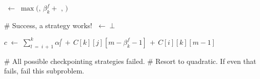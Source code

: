 \begin{algorithm}
{{{{                    \Peak \(\;\leftarrow\; \max( \)\PeakFs\(,\, \beta^f_k + \) \PeakR\(,\,\)\PeakL\( ) \)\;
                    \BlankLine
            
                    \BlankLine
            
                    \# Success, a strategy works!\;
                    \Failed\(\;\leftarrow\; \bot\)\;
                    \BlankLine
            
                    \(c \;\leftarrow\; \sum_{l\;=\;i\,+\,1}^k \alpha^f_l \,+\, C[k][j][m-\beta^f_k-1] \,+\, C[i][k][m-1]\)\;
                    \BlankLine
            
                }
                \BlankLine
            
                \# All possible checkpointing strategies failed.\;
                \BlankLine
                \# Resort to quadratic. If even that fails, fail this subproblem.\;
            }
        }
    }

\end{algorithm}